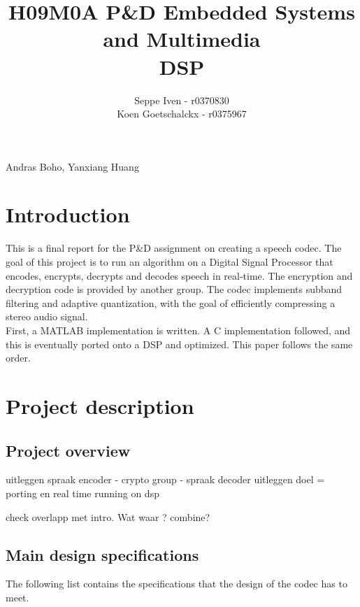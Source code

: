 \documentclass[a4paper]{article}
\title{H09M0A P\&D Embedded Systems and Multimedia \\ DSP}
\author{Seppe Iven - r0370830 \\ Koen Goetschalckx - r0375967}
\begin{document}
 
\maketitle
\begin{center}Andras Boho, Yanxiang Huang
\end{center}
\section{Introduction}
This is a final report for the P\&D assignment on creating a speech codec. The goal of this project is to run an algorithm on a Digital Signal Processor that encodes, encrypts, decrypts and decodes speech in real-time. The encryption and decryption code is provided by another group. The codec implements subband filtering and adaptive quantization, with the goal of efficiently compressing a stereo audio signal.\\

First, a MATLAB implementation is written. A C implementation followed, and this is eventually ported onto a DSP and optimized. This paper follows the same order.
\section{Project description}
\subsection{Project overview}
uitleggen spraak encoder - crypto group - spraak decoder
uitleggen doel = porting en real time running on dsp

check overlapp met intro. Wat waar ?  combine?
\subsection{Main design specifications}
The following list contains the specifications that the design of the codec has to meet.
\end{document}
